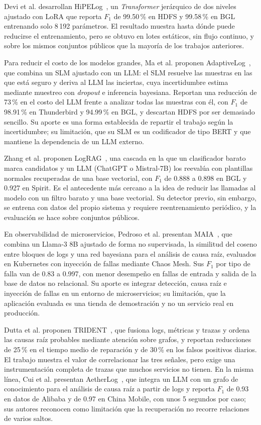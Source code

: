 Devi et al. desarrollan HiPELog~\cite{devi2026_hipelog}, un \textit{Transformer} jerárquico de dos niveles ajustado con LoRA que reporta $F_1$ de 99.50\,\% en HDFS y 99.58\,\% en BGL entrenando solo 8\,192 parámetros. El resultado muestra hasta dónde puede reducirse el entrenamiento, pero se obtuvo en lotes estáticos, sin flujo continuo, y sobre los mismos conjuntos públicos que la mayoría de los trabajos anteriores.

Para reducir el costo de los modelos grandes, Ma et al. proponen AdaptiveLog~\cite{ma2026_adaptivelog}, que combina un SLM ajustado con un LLM: el SLM resuelve las muestras en las que está seguro y deriva al LLM las inciertas, cuya incertidumbre estima mediante muestreo con \textit{dropout} e inferencia bayesiana. Reportan una reducción de 73\,\% en el costo del LLM frente a analizar todas las muestras con él, con $F_1$ de 98.91\,\% en Thunderbird y 94.99\,\% en BGL, y descartan HDFS por ser demasiado sencillo. Su aporte es una forma establecida de repartir el trabajo según la incertidumbre; su limitación, que su SLM es un codificador de tipo BERT y que mantiene la dependencia de un LLM externo.

Zhang et al. proponen LogRAG~\cite{zhang2024_lograg}, una cascada en la que un clasificador barato marca candidatos y un LLM (ChatGPT o Mistral-7B) los reevalúa con plantillas normales recuperadas de una base vectorial, con $F_1$ de 0.888 a 0.898 en BGL y 0.927 en Spirit. Es el antecedente más cercano a la idea de reducir las llamadas al modelo con un filtro barato y una base vectorial. Su detector previo, sin embargo, se entrena con datos del propio sistema y requiere reentrenamiento periódico, y la evaluación se hace sobre conjuntos públicos.

En observabilidad de microservicios, Pedroso et al. presentan MAIA~\cite{pedroso2025_maia}, que combina un Llama-3 8B ajustado de forma no supervisada, la similitud del coseno entre bloques de logs y una red bayesiana para el análisis de causa raíz, evaluados en Kubernetes con inyección de fallas mediante Chaos Mesh. Sus $F_1$ por tipo de falla van de 0.83 a 0.997, con menor desempeño en fallas de entrada y salida de la base de datos no relacional. Su aporte es integrar detección, causa raíz e inyección de fallas en un entorno de microservicios; su limitación, que la aplicación evaluada es una tienda de demostración y no un servicio real en producción.

Dutta et al. proponen TRIDENT~\cite{dutta2025_trident}, que fusiona logs, métricas y trazas y ordena las causas raíz probables mediante atención sobre grafos, y reportan reducciones de 25\,\% en el tiempo medio de reparación y de 30\,\% en los falsos positivos diarios. El trabajo muestra el valor de correlacionar las tres señales, pero exige una instrumentación completa de trazas que muchos servicios no tienen. En la misma línea, Cui et al. presentan AetherLog~\cite{cui2025_aetherlog}, que integra un LLM con un grafo de conocimiento para el análisis de causa raíz a partir de logs y reporta $F_1$ de 0.93 en datos de Alibaba y de 0.97 en China Mobile, con unos 5 segundos por caso; sus autores reconocen como limitación que la recuperación no recorre relaciones de varios saltos.

